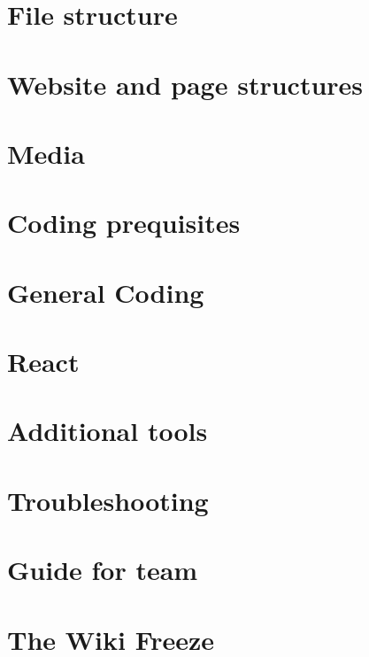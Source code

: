 \documentclass[a4paper, 11pt, twoside]{book}
\begin{document}
\chapter{File structure} \label{ch:structure}
%
\newpage
%
\chapter{Website and page structures} \label{ch:webstructure}
%
\newpage
%
\chapter{Media}\label{ch:media}
%
\newpage
%
\chapter{Coding prequisites} \label{ch:cod}
%
\newpage
%
\chapter{General Coding}  \label{ch:coding}
%
\newpage
%
\chapter{React} \label{ch:react}
%
%
\newpage
%
\chapter{Additional tools} \label{ch:addtools}
%
\newpage
%
\chapter{Troubleshooting} \label{ch:troubleshooting}
%
\newpage
%
\chapter{Guide for team} \label{ch:guide}
%
\newpage
%
\chapter{The Wiki Freeze}  \label{ch:freeze}
%
\newpage
%
\end{document}
